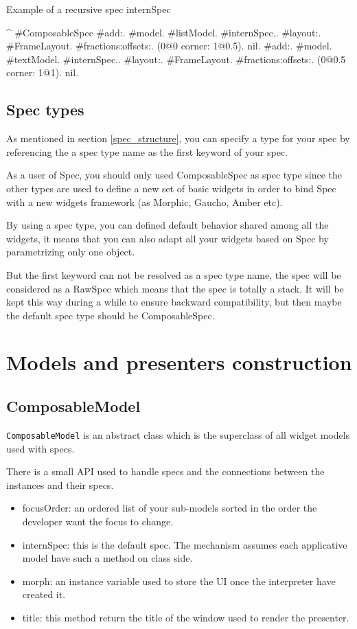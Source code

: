 \documentclass[a4paper,10pt,twoside]{book}
\begin{document}
\begin{method}{Example of a recursive spec}
internSpec

	^ { #ComposableSpec
			#add:. {{#model. #listModel. #internSpec.}.
						#layout:. {#FrameLayout.
									#fractions:offsets:. (0@0 corner: 1@0.5). nil}}.
			#add:. {{#model. #textModel. #internSpec.}.
						#layout:. {#FrameLayout.
									#fractions:offsets:. (0@0.5 corner: 1@1). nil}}}.
\end{method} 

\subsection{Spec types}

As mentioned in section \ref{spec_structure}, you can specify a type for your spec by referencing the a spec type name as the first keyword of your spec.

As a user of Spec, you should only used ComposableSpec as spec type since the other types are used to define a new set of basic widgets in order to bind Spec with a new widgets framework (as Morphic, Gaucho, Amber etc).

By using a spec type, you can defined default behavior shared among all the widgets, it means that you can also adapt all your widgets based on Spec by parametrizing only one object.

But the first keyword can not be resolved as a spec type name, the spec will be considered as a RawSpec which means that the spec is totally a stack. It will be kept this way during a while to ensure backward compatibility, but then maybe the default spec type should be ComposableSpec.

\section{Models and presenters construction}

\subsection{ComposableModel}

\verb+ComposableModel+ is an abstract class which is the superclass of all widget models used with specs.

There is a small API used to handle specs and the connections between the instances and their specs.

\begin{itemize}
	\item focusOrder: an ordered list of your sub-models sorted in the order the developer want the focus to change.
	\item internSpec: this is the default spec. The mechanism assumes each applicative model have such a method on class side.
	\item morph: an instance variable used to store the UI once the interpreter have created it.	
	\item title: this method return the title of the window used to render the presenter.
\end{itemize}
\end{document}
